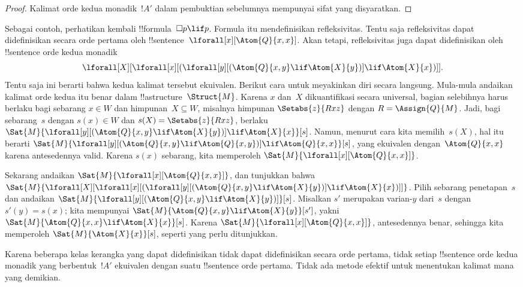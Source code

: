 \documentclass[../../../include/open-logic-section]{subfiles}
\begin{document}
\begin{proof}
  Kalimat orde kedua monadik~$!A'$ dalam pembuktian sebelumnya mempunyai sifat
  yang disyaratkan.
\end{proof}

Sebagai contoh, perhatikan kembali !!{formula}~$\Box p\lif p$. Formula itu
mendefinisikan refleksivitas. Tentu saja refleksivitas dapat didefinisikan
secara orde pertama oleh !!{sentence}~$\lforall[x][\Atom{Q}{x,x}]$. Akan
tetapi, refleksivitas juga dapat didefinisikan oleh !!{sentence} orde kedua
monadik
\[
\lforall[X][\lforall[x][(\lforall[y][(\Atom{Q}{x,y} \lif \Atom{X}{y})]
    \lif \Atom{X}{x})]].
\]
Tentu saja ini berarti bahwa kedua kalimat tersebut ekuivalen. Berikut cara
untuk meyakinkan diri secara langsung. Mula-mula andaikan kalimat orde kedua
itu benar dalam !!a{structure}~$\Struct{M}$. Karena $x$ dan~$X$
dikuantifikasi secara universal, bagian selebihnya harus berlaku bagi
sebarang $x\in W$ dan himpunan~$X\subseteq W$, misalnya himpunan
$\Setabs{z}{Rxz}$ dengan $R=\Assign{Q}{M}$. Jadi, bagi sebarang~$s$ dengan
$s(x)\in W$ dan $s(X)=\Setabs{z}{Rxz}$, berlaku
$\Sat{M}{\lforall[y][(\Atom{Q}{x,y}\lif\Atom{X}{y})]\lif
    \Atom{X}{x}}[s]$. Namun, menurut cara kita memilih~$s(X)$, hal itu berarti
$\Sat{M}{\lforall[y][(\Atom{Q}{x,y}\lif\Atom{Q}{x,y})]\lif
    \Atom{Q}{x,x}}[s]$, yang ekuivalen dengan~$\Atom{Q}{x,x}$ karena
antesedennya valid. Karena $s(x)$ sebarang, kita memperoleh
$\Sat{M}{\lforall[x][\Atom{Q}{x,x}]}$.

Sekarang andaikan $\Sat{M}{\lforall[x][\Atom{Q}{x,x}]}$, dan tunjukkan bahwa
$\Sat{M}{\lforall[X][\lforall[x][(\lforall[y][(\Atom{Q}{x,y}\lif
        \Atom{X}{y})]\lif\Atom{X}{x})]]}$. Pilih sebarang penetapan~$s$ dan
andaikan $\Sat{M}{\lforall[y][(\Atom{Q}{x,y}\lif\Atom{X}{y})]}[s]$.
Misalkan $s'$ merupakan varian-$y$ dari~$s$ dengan $s'(y)=s(x)$; kita
mempunyai $\Sat{M}{\Atom{Q}{x,y}\lif\Atom{X}{y}}[s']$, yakni
$\Sat{M}{\Atom{Q}{x,x}\lif\Atom{X}{x}}[s]$. Karena
$\Sat{M}{\lforall[x][\Atom{Q}{x,x}]}$, antesedennya benar, sehingga kita
memperoleh $\Sat{M}{\Atom{X}{x}}[s]$, seperti yang perlu ditunjukkan.

Karena beberapa kelas kerangka yang dapat didefinisikan tidak dapat
didefinisikan secara orde pertama, tidak setiap !!{sentence} orde kedua
monadik yang berbentuk~$!A'$ ekuivalen dengan suatu !!{sentence} orde pertama.
Tidak ada metode efektif untuk menentukan kalimat mana yang demikian.
\end{document}
